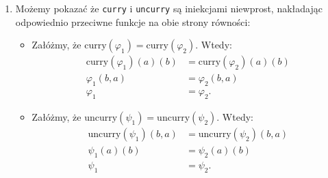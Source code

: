 \documentclass[11pt,a4paper]{article}
\begin{document}
\begin{enumerate}
\begin{itemize}
            \item \( \text{uncurry} \circ \text{curry} \)
                \begin{equation}
                    \begin{aligned}
                        (\text{uncurry} \circ \text{curry})(\varphi)
                        &= \text{uncurry}(\text{curry}(\varphi)) \\
                        &= \text{uncurry}(\lambda a \in A \to (\lambda b \in B \to \varphi(b, a))) \\
                        &= \lambda b \in B \to (\lambda a \in A \to \varphi(b, a)).
                    \end{aligned}
                \end{equation}
        \end{itemize}
        Z powyższych równań wynika, że \( \text{curry} \circ \text{uncurry} = \text{id}_{(C^B)^A} \) oraz \( \text{uncurry} \circ \text{curry} = \text{id}_{C^{B \times A}} \). \qed
    \item Możemy pokazać że \texttt{curry} i \texttt{uncurry} są iniekcjami niewprost, nakładając odpowiednio przeciwne funkcje na obie strony równości:
                \begin{itemize}
            \item Załóżmy, że \( \text{curry}(\varphi_1) = \text{curry}(\varphi_2) \). Wtedy:
                \begin{equation}
                    \begin{aligned}
                        \text{curry}(\varphi_1)(a)(b) &= \text{curry}(\varphi_2)(a)(b) \\
                        \varphi_1(b, a) &= \varphi_2(b, a) \\
                        \varphi_1 &= \varphi_2.
                    \end{aligned}
                \end{equation}
            \item Załóżmy, że \( \text{uncurry}(\psi_1) = \text{uncurry}(\psi_2) \). Wtedy:
                \begin{equation}
                    \begin{aligned}
                        \text{uncurry}(\psi_1)(b, a) &= \text{uncurry}(\psi_2)(b, a) \\
                        \psi_1(a)(b) &= \psi_2(a)(b) \\
                        \psi_1 &= \psi_2.
                    \end{aligned}

\end{equation}
\end{itemize}
\end{enumerate}
\end{document}
